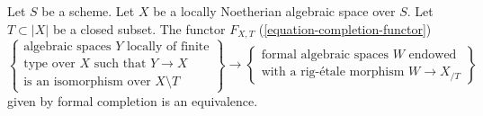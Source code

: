 \begin{theorem}
\label{theorem-dilatations-general}
Let $S$ be a scheme. Let $X$ be a locally Noetherian algebraic space over $S$.
Let $T \subset |X|$ be a closed subset. The functor $F_{X, T}$
(\ref{equation-completion-functor})
$$
\left\{
\begin{matrix}
\text{algebraic spaces }Y\text{ locally of finite}\\
\text{type over }X\text{ such that }Y \to X\\
\text{is an isomorphism over }X \setminus T
\end{matrix}
\right\}
\longrightarrow
\left\{
\begin{matrix}
\text{formal algebraic spaces }W\text{ endowed} \\
\text{with a rig-\'etale morphism }W \to X_{/T}
\end{matrix}
\right\}
$$
given by formal completion is an equivalence.
\end{theorem}

